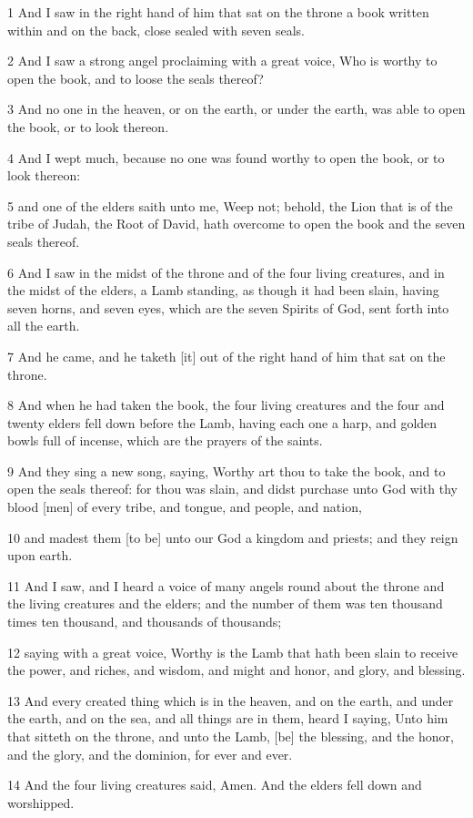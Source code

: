 \par 1 And I saw in the right hand of him that sat on the throne a book written within and on the back, close sealed with seven seals.
\par 2 And I saw a strong angel proclaiming with a great voice, Who is worthy to open the book, and to loose the seals thereof?
\par 3 And no one in the heaven, or on the earth, or under the earth, was able to open the book, or to look thereon.
\par 4 And I wept much, because no one was found worthy to open the book, or to look thereon:
\par 5 and one of the elders saith unto me, Weep not; behold, the Lion that is of the tribe of Judah, the Root of David, hath overcome to open the book and the seven seals thereof.
\par 6 And I saw in the midst of the throne and of the four living creatures, and in the midst of the elders, a Lamb standing, as though it had been slain, having seven horns, and seven eyes, which are the seven Spirits of God, sent forth into all the earth.
\par 7 And he came, and he taketh [it] out of the right hand of him that sat on the throne.
\par 8 And when he had taken the book, the four living creatures and the four and twenty elders fell down before the Lamb, having each one a harp, and golden bowls full of incense, which are the prayers of the saints.
\par 9 And they sing a new song, saying, Worthy art thou to take the book, and to open the seals thereof: for thou was slain, and didst purchase unto God with thy blood [men] of every tribe, and tongue, and people, and nation,
\par 10 and madest them [to be] unto our God a kingdom and priests; and they reign upon earth.
\par 11 And I saw, and I heard a voice of many angels round about the throne and the living creatures and the elders; and the number of them was ten thousand times ten thousand, and thousands of thousands;
\par 12 saying with a great voice, Worthy is the Lamb that hath been slain to receive the power, and riches, and wisdom, and might and honor, and glory, and blessing.
\par 13 And every created thing which is in the heaven, and on the earth, and under the earth, and on the sea, and all things are in them, heard I saying, Unto him that sitteth on the throne, and unto the Lamb, [be] the blessing, and the honor, and the glory, and the dominion, for ever and ever.
\par 14 And the four living creatures said, Amen. And the elders fell down and worshipped.

